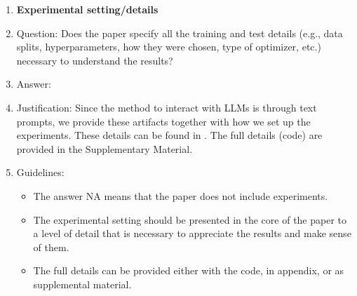 \documentclass{article}
\begin{document}
\begin{enumerate}
\item {\bf Experimental setting/details}
    \item[] Question: Does the paper specify all the training and test details (e.g., data splits, hyperparameters, how they were chosen, type of optimizer, etc.) necessary to understand the results?
    \item[] Answer: \answerYes{} %
    \item[] Justification: Since the method to interact with LLMs is through text prompts, we provide these artifacts together with how we set up the experiments. These details can be found in . The full details (code) are provided in the Supplementary Material.
    \item[] Guidelines:
    \begin{itemize}
        \item The answer NA means that the paper does not include experiments.
        \item The experimental setting should be presented in the core of the paper to a level of detail that is necessary to appreciate the results and make sense of them.
        \item The full details can be provided either with the code, in appendix, or as supplemental material.
    \end{itemize}


\end{enumerate}
\end{document}
